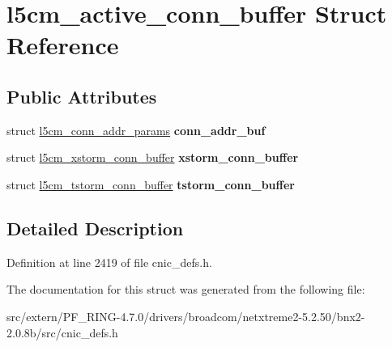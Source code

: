 \hypertarget{structl5cm__active__conn__buffer}{
\section{l5cm\_\-active\_\-conn\_\-buffer Struct Reference}
\label{structl5cm__active__conn__buffer}
}
\subsection*{Public Attributes}
\begin{DoxyCompactItemize}
\item 
\hypertarget{structl5cm__active__conn__buffer_af1d77b2ab3da8e17b2df717eb2098413}{
struct \hyperlink{structl5cm__conn__addr__params}{l5cm\_\-conn\_\-addr\_\-params} {\bfseries conn\_\-addr\_\-buf}}
\label{structl5cm__active__conn__buffer_af1d77b2ab3da8e17b2df717eb2098413}

\item 
\hypertarget{structl5cm__active__conn__buffer_a3d50a81b87d8b870f881c6351d9ab41e}{
struct \hyperlink{structl5cm__xstorm__conn__buffer}{l5cm\_\-xstorm\_\-conn\_\-buffer} {\bfseries xstorm\_\-conn\_\-buffer}}
\label{structl5cm__active__conn__buffer_a3d50a81b87d8b870f881c6351d9ab41e}

\item 
\hypertarget{structl5cm__active__conn__buffer_a800ad3d7fa4d23e8ab974e4403817006}{
struct \hyperlink{structl5cm__tstorm__conn__buffer}{l5cm\_\-tstorm\_\-conn\_\-buffer} {\bfseries tstorm\_\-conn\_\-buffer}}
\label{structl5cm__active__conn__buffer_a800ad3d7fa4d23e8ab974e4403817006}

\end{DoxyCompactItemize}


\subsection{Detailed Description}


Definition at line 2419 of file cnic\_\-defs.h.



The documentation for this struct was generated from the following file:\begin{DoxyCompactItemize}
\item 
src/extern/PF\_\-RING-\/4.7.0/drivers/broadcom/netxtreme2-\/5.2.50/bnx2-\/2.0.8b/src/cnic\_\-defs.h\end{DoxyCompactItemize}
